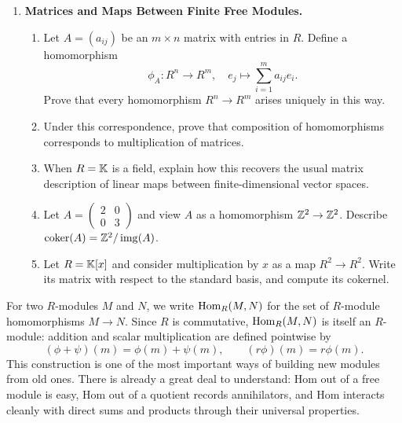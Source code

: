 \documentclass[12pt,reqno]{amsart}
\begin{document}
\begin{enumerate}[leftmargin=*, resume=problems]
\item \textbf{Matrices and Maps Between Finite Free Modules.}
    \begin{enumerate}
    \item Let $A=(a_{ij})$ be an $m\times n$ matrix with entries in $R$. Define a homomorphism
    \[
    \phi_A:R^n\to R^m,
    \quad
    e_j\longmapsto \sum_{i=1}^m a_{ij}e_i.
    \]
    Prove that every homomorphism $R^n\to R^m$ arises uniquely in this way.
    \item Under this correspondence, prove that composition of homomorphisms corresponds to multiplication of matrices.
    \item When $R=\mathbb{K}$ is a field, explain how this recovers the usual matrix description of linear maps between finite-dimensional vector spaces.
    \item Let $A=\begin{pmatrix}2&0\\0&3\end{pmatrix}$ and view $A$ as a homomorphism $\mathbb{Z}^2\to \mathbb{Z}^2$. Describe $\operatorname{coker}(A)=\mathbb{Z}^2/\operatorname{img}(A)$.
    \item Let $R=\mathbb{K}[x]$ and consider multiplication by $x$ as a map $R^2\to R^2$. Write its matrix with respect to the standard basis, and compute its cokernel.
    \end{enumerate}
\end{enumerate}

\hrulefill

For two $R$-modules $M$ and $N$, we write $\operatorname{Hom}_R(M,N)$ for the set of $R$-module homomorphisms $M\to N$. Since $R$ is commutative, $\operatorname{Hom}_R(M,N)$ is itself an $R$-module: addition and scalar multiplication are defined pointwise by
\[
(\phi+\psi)(m)=\phi(m)+\psi(m),
\qquad
(r\phi)(m)=r\phi(m).
\]
This construction is one of the most important ways of building new modules from old ones. There is already a great deal to understand: Hom out of a free module is easy, Hom out of a quotient records annihilators, and Hom interacts cleanly with direct sums and products through their universal properties.

\hrulefill
\end{document}
